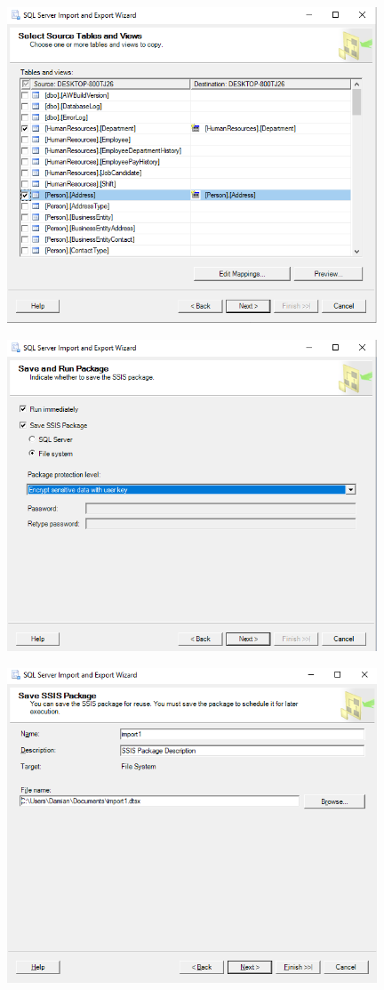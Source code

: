 \begin{itemize}
\begin{center}
	\end{center}	
	\begin{center}
	\includegraphics[width=11cm]{./Imagenes/imagen7}
	\end{center}	
	\begin{center}
	\includegraphics[width=11cm]{./Imagenes/imagen8}
	\end{center}	
	\begin{center}
	\includegraphics[width=11cm]{./Imagenes/imagen9}

\end{center}
\end{itemize}

